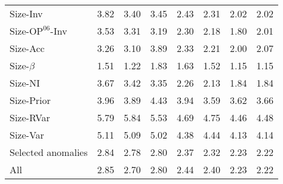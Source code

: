 \begin{table}[!ht]
\begin{tabular}{lrrrrrrr}
  
    
    
    Size-Inv  & 3.82  & 3.40  & 3.45  & 2.43  & 2.31  & 2.02  & 2.02  \\
    
  
    
    
    Size-$\text{OP}^{06}$-Inv  & 3.53  & 3.31  & 3.19  & 2.30  & 2.18  & 1.80  & 2.01  \\
    
  
    
    
    Size-Acc  & 3.26  & 3.10  & 3.89  & 2.33  & 2.21  & 2.00  & 2.07  \\
    
  
    
    
    Size-$\beta$  & 1.51  & 1.22  & 1.83  & 1.63  & 1.52  & 1.15  & 1.15  \\
    
  
    
    
    Size-NI  & 3.67  & 3.42  & 3.35  & 2.26  & 2.13  & 1.84  & 1.84  \\
    
  
    
    
    Size-Prior  & 3.96  & 3.89  & 4.43  & 3.94  & 3.59  & 3.62  & 3.66  \\
    
  
    
    
    Size-RVar  & 5.79  & 5.84  & 5.53  & 4.69  & 4.75  & 4.46  & 4.48  \\
    
  
    
    
    Size-Var  & 5.11  & 5.09  & 5.02  & 4.38  & 4.44  & 4.13  & 4.14  \\
    
  
    
    
    Selected anomalies  & 2.84  & 2.78  & 2.80  & 2.37  & 2.32  & 2.23  & 2.22  \\
    [1em]
  
    
    
    All  & 2.85  & 2.70  & 2.80  & 2.44  & 2.40  & 2.23  & 2.22  \\
    
  
  \bottomrule
\end{tabular}
\label{tbl:GRS}
\end{table}